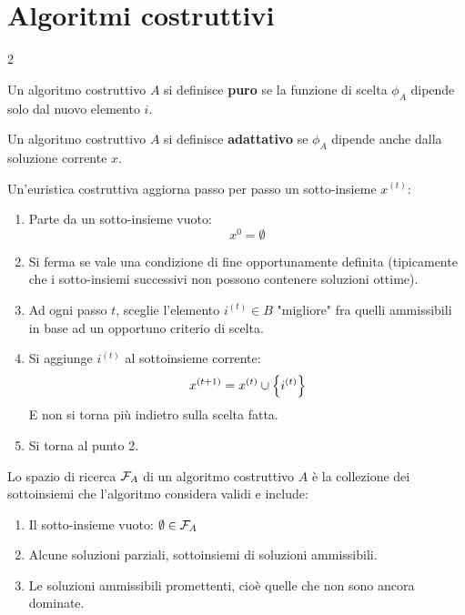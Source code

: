 \documentclass[\main/main.tex]{subfiles}
\begin{document}
\chapter{Algoritmi costruttivi}
\begin{multicols}{2}
\begin{definition}
    Un algoritmo costruttivo \(A\) si definisce \textbf{puro} se la funzione di scelta \(\phi_A\) dipende solo dal nuovo elemento \(i\).
\end{definition}
\begin{definition}
    Un algoritmo costruttivo \(A\) si definisce \textbf{adattativo} se \(\phi_A\) dipende anche dalla soluzione corrente \(x\).
\end{definition}
\begin{definition}
    Un'euristica costruttiva aggiorna passo per passo un sotto-insieme \(x^{(t)}\):
    \begin{enumerate}
        \item Parte da un sotto-insieme vuoto:
        \[
            x^{0} = \emptyset
        \]
        \item Si ferma se vale una condizione di fine opportunamente definita (tipicamente che i sotto-insiemi successivi non possono contenere soluzioni ottime).
        \item Ad ogni passo \(t\), sceglie l'elemento \(i^{(t)} \in B\) "migliore" fra quelli ammissibili in base ad un opportuno criterio di scelta.
        \item Si aggiunge \(i^{(t)}\) al sottoinsieme corrente:
        \[
            x^{(t+1)} = x^{(t)} \cup \left\{i^{(t)}\right\}
        \]
        E non si torna più indietro sulla scelta fatta.
        \item Si torna al punto 2.
    \end{enumerate}
\end{definition}
\begin{definition}
    Lo spazio di ricerca \(\mathcal{F}_A\) di un algoritmo costruttivo \(A\) è la collezione dei sottoinsiemi che l'algoritmo considera validi e include:
    \begin{enumerate}
        \item Il sotto-insieme vuoto: \(\emptyset \in \mathcal{F}_A\)
        \item Alcune soluzioni parziali, sottoinsiemi di soluzioni ammissibili.
        \item Le soluzioni ammissibili promettenti, cioè quelle che non sono ancora dominate.

\end{enumerate}
\end{definition}
\end{multicols}
\end{document}
